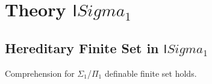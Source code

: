 \chapter{Theory $\mathsf{I}Sigma_1$}

\section{Hereditary Finite Set in $\mathsf{I}Sigma_1$}

\begin{theorem}\label{LO.FirstOrder.Arith.Model.finite_comprehension₁!}
  \leanok
  Comprehension for $\Sigma_1$/$\Pi_1$ definable finite set holds.
\end{theorem}